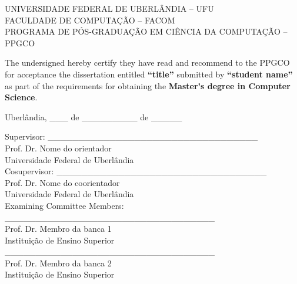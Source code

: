 \documentclass[a4paper,12pt]{report}
\begin{document}
\thispagestyle{empty}

\begin{center}
UNIVERSIDADE FEDERAL DE UBERLÂNDIA -- UFU\\
FACULDADE DE COMPUTAÇÃO -- FACOM\\
PROGRAMA DE PÓS-GRADUAÇÃO EM CIÊNCIA DA COMPUTAÇÃO -- PPGCO
\end{center}

\vspace{1cm}

The undersigned hereby certify they have read and recommend to the PPGCO for acceptance the dissertation entitled \textbf{``title''} submitted by \textbf{``student name''} as part of the requirements for obtaining the \textbf{Master's degree in Computer Science}.

\begin{flushright}

\vspace{1cm}
Uberlândia, \_\_\_ de \_\_\_\_\_\_\_\_\_ de \_\_\_\_\_

\vspace{1cm}
Supervisor: \_\_\_\_\_\_\_\_\_\_\_\_\_\_\_\_\_\_\_\_\_\_\_\_\_\_\_\_\_\_\_\_\_\_ \\
Prof. Dr. Nome do orientador \\
Universidade Federal de Uberlândia \\

\vspace{1cm}
Cosupervisor: \_\_\_\_\_\_\_\_\_\_\_\_\_\_\_\_\_\_\_\_\_\_\_\_\_\_\_\_\_\_\_\_\_\_ \\
Prof. Dr. Nome do coorientador \\
Universidade Federal de Uberlândia \\

\vspace{1cm}
Examining Committee Members: \\

\vspace{1cm}
\_\_\_\_\_\_\_\_\_\_\_\_\_\_\_\_\_\_\_\_\_\_\_\_\_\_\_\_\_\_\_\_\_\_ \\
Prof. Dr. Membro da banca 1 \\
Instituição de Ensino Superior \\

\vspace{1cm}
\_\_\_\_\_\_\_\_\_\_\_\_\_\_\_\_\_\_\_\_\_\_\_\_\_\_\_\_\_\_\_\_\_\_ \\
Prof. Dr. Membro da banca 2\\
Instituição de Ensino Superior \\

\end{flushright}
\end{document}

